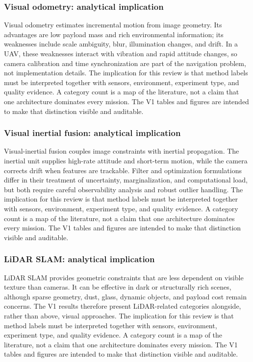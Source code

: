 \documentclass[
  journal,
  10pt]{IEEEtran}
\begin{document}
\subsubsection{Visual odometry: analytical
implication}\label{visual-odometry-analytical-implication-2}

Visual odometry estimates incremental motion from image geometry. Its
advantages are low payload mass and rich environmental information; its
weaknesses include scale ambiguity, blur, illumination changes, and
drift. In a UAV, these weaknesses interact with vibration and rapid
attitude changes, so camera calibration and time synchronization are
part of the navigation problem, not implementation details. The
implication for this review is that method labels must be interpreted
together with sensors, environment, experiment type, and quality
evidence. A category count is a map of the literature, not a claim that
one architecture dominates every mission. The V1 tables and figures are
intended to make that distinction visible and auditable.

\subsubsection{Visual inertial fusion: analytical
implication}\label{visual-inertial-fusion-analytical-implication-2}

Visual-inertial fusion couples image constraints with inertial
propagation. The inertial unit supplies high-rate attitude and
short-term motion, while the camera corrects drift when features are
trackable. Filter and optimization formulations differ in their
treatment of uncertainty, marginalization, and computational load, but
both require careful observability analysis and robust outlier handling.
The implication for this review is that method labels must be
interpreted together with sensors, environment, experiment type, and
quality evidence. A category count is a map of the literature, not a
claim that one architecture dominates every mission. The V1 tables and
figures are intended to make that distinction visible and auditable.

\subsubsection{LiDAR SLAM: analytical
implication}\label{lidar-slam-analytical-implication-2}

LiDAR SLAM provides geometric constraints that are less dependent on
visible texture than cameras. It can be effective in dark or
structurally rich scenes, although sparse geometry, dust, glass, dynamic
objects, and payload cost remain concerns. The V1 results therefore
present LiDAR-related categories alongside, rather than above, visual
approaches. The implication for this review is that method labels must
be interpreted together with sensors, environment, experiment type, and
quality evidence. A category count is a map of the literature, not a
claim that one architecture dominates every mission. The V1 tables and
figures are intended to make that distinction visible and auditable.
\end{document}
